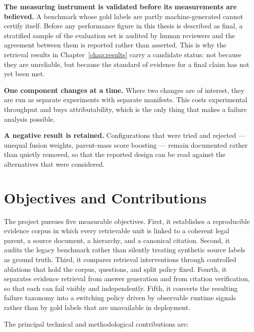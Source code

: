 \textbf{The measuring instrument is validated before its measurements are believed.} A benchmark whose gold labels are partly machine-generated cannot certify itself. Before any performance figure in this thesis is described as final, a stratified sample of the evaluation set is audited by human reviewers and the agreement between them is reported rather than asserted. This is why the retrieval results in Chapter~\ref{chap:results} carry a candidate status: not because they are unreliable, but because the standard of evidence for a final claim has not yet been met.

\textbf{One component changes at a time.} Where two changes are of interest, they are run as separate experiments with separate manifests. This costs experimental throughput and buys attributability, which is the only thing that makes a failure analysis possible.

\textbf{A negative result is retained.} Configurations that were tried and rejected --- unequal fusion weights, parent-mass score boosting --- remain documented rather than quietly removed, so that the reported design can be read against the alternatives that were considered.

\section{Objectives and Contributions}
\label{sec:intro-contributions}

The project pursues five measurable objectives. First, it establishes a reproducible evidence corpus in which every retrievable unit is linked to a coherent legal parent, a source document, a hierarchy, and a canonical citation. Second, it audits the legacy benchmark rather than silently treating synthetic source labels as ground truth. Third, it compares retrieval interventions through controlled ablations that hold the corpus, questions, and split policy fixed. Fourth, it separates evidence retrieval from answer generation and from citation verification, so that each can fail visibly and independently. Fifth, it converts the resulting failure taxonomy into a switching policy driven by observable runtime signals rather than by gold labels that are unavailable in deployment.

The principal technical and methodological contributions are:

